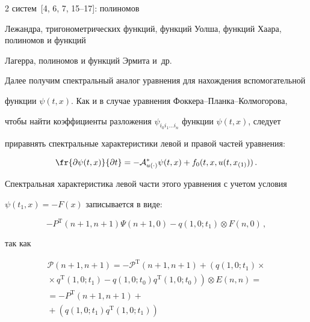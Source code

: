 \begin{multicols}{2}
сис\-тем~[4, 6, 7, 15--17]: полиномов 


Лежандра, тригонометрических функций, функций Уолша, функций Хаара, полиномов и функций 


Лагерра, полиномов и функций Эрмита и~др.





Далее получим спектральный аналог уравнения для нахождения вспомогательной 


функции $\psi(t,x)$. Как и в случае уравнения Фок\-ке\-ра--План\-ка--Кол\-мо\-го\-ро\-ва, 


чтобы найти коэффициенты разложения $\psi_{i_0 i_1 \dots i_n}$ функции $\psi(t,x)$, следует 


приравнять спект\-раль\-ные характеристики левой и правой час\-тей уравнения:


\begin{equation}


\label{eqPsiOp}


  \fr{\partial \psi(t,x)}{\partial t} = - \mathcal{A}^*_{u(\cdot)} \psi(t,x) + f_0(t,x,u(t,x_{(1)}))\,.


\end{equation}





Спектральная характеристика левой части этого уравнения с учетом условия 


${\psi(t_1,x) = - F(x)}$ записывается в виде:


$$


  - P^\mathrm{T}(n+1,n+1) \Psi(n+1,0) - q(1,0;t_1) \otimes F(n,0)\,,


$$


так как


\begin{multline*}




  \mathcal{P}(n+1,n+1) =  - \mathcal{P}^\mathrm{T}(n+1,n+1) + \left( q(1,0;t_1) \times{}\right.\\


\left.  {}\times


  q^\mathrm{T}(1,0;t_1) - q(1,0;t_0) q^\mathrm{T}(1,0;t_0) \right) \otimes E(n,n) = {}\\


{}  = - P^\mathrm{T}(n+1,n+1) +{}\\


{}+ \left( q(1,0;t_1) q^\mathrm{T}(1,0;t_1) \right) 



\end{multline*}
\end{multicols}
